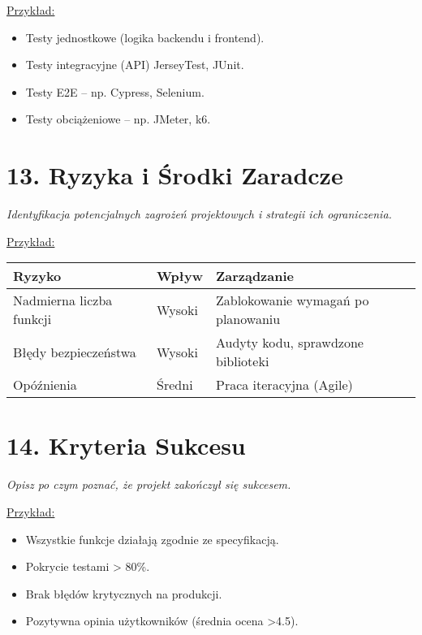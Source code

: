 \documentclass[a4paper,12pt]{article}
\begin{document}
\vspace{0.5 cm}
 \noindent
\underline{Przykład:} 
\begin{itemize}
    \item Testy jednostkowe (logika backendu i frontend).
    \item Testy integracyjne (API) JerseyTest, JUnit.
    \item Testy E2E – np. Cypress, Selenium.
    \item Testy obciążeniowe – np. JMeter, k6.
\end{itemize}

\section*{13. Ryzyka i Środki Zaradcze}
\textit{Identyfikacja potencjalnych zagrożeń projektowych i strategii ich ograniczenia.}

\vspace{0.5 cm}
 \noindent
\underline{Przykład:} 
\begin{longtable}{|p{5cm}|p{3cm}|p{6cm}|}
\hline
\textbf{Ryzyko} & \textbf{Wpływ} & \textbf{Zarządzanie} \\
\hline
Nadmierna liczba funkcji & Wysoki & Zablokowanie wymagań po planowaniu \\
\hline
Błędy bezpieczeństwa & Wysoki & Audyty kodu, sprawdzone biblioteki \\
\hline
Opóźnienia & Średni & Praca iteracyjna (Agile) \\
\hline
\end{longtable}

\section*{14. Kryteria Sukcesu}
\textit{Opisz po czym poznać, że projekt zakończył się sukcesem.}

\vspace{0.5 cm}
 \noindent
\underline{Przykład:} 
\vspace{0.5 cm}
 \noindent
\begin{itemize}
    \item Wszystkie funkcje działają zgodnie ze specyfikacją.
    \item Pokrycie testami > 80\%.
    \item Brak błędów krytycznych na produkcji.
    \item Pozytywna opinia użytkowników (średnia ocena \textgreater 4.5).
\end{itemize}
\end{document}
